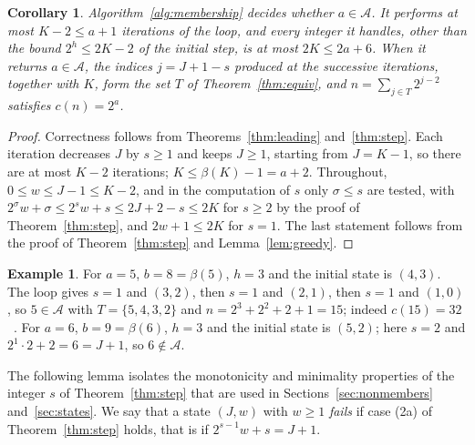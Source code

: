 \documentclass[11pt]{amsart}
\newtheorem{Corollary}[Theorem]{Corollary}
\theoremstyle{definition}
\newtheorem{Example}[Theorem]{Example}
\begin{document}
\begin{Corollary}
\label{cor:algo}
Algorithm~\ref{alg:membership} decides whether $a\in\mathcal{A}$. It performs at most $K-2\le a+1$ iterations of the loop, and every integer it handles, other than the bound $2^h\le2K-2$ of the initial step, is at most $2K\le2a+6$. When it returns $a\in\mathcal{A}$, the indices $j=J+1-s$ produced at the successive iterations, together with $K$, form the set $T$ of Theorem~\ref{thm:equiv}, and $n=\sum_{j\in T}2^{j-2}$ satisfies $c(n)=2^a$.
\end{Corollary}
\begin{proof}
Correctness follows from Theorems~\ref{thm:leading} and~\ref{thm:step}. Each iteration decreases $J$ by $s\ge1$ and keeps $J\ge1$, starting from $J=K-1$, so there are at most $K-2$ iterations; $K\le\beta(K)-1=a+2$. Throughout, $0\le w\le J-1\le K-2$, and in the computation of $s$ only $\sigma\le s$ are tested, with $2^{\sigma}w+\sigma\le2^sw+s\le2J+2-s\le2K$ for $s\ge2$ by the proof of Theorem~\ref{thm:step}, and $2w+1\le2K$ for $s=1$. The last statement follows from the proof of Theorem~\ref{thm:step} and Lemma~\ref{lem:greedy}.
\end{proof}

\begin{Example}
\label{ex:algo}
For $a=5$, $b=8=\beta(5)$, $h=3$ and the initial state is $(4,3)$. The loop gives $s=1$ and $(3,2)$, then $s=1$ and $(2,1)$, then $s=1$ and $(1,0)$, so $5\in\mathcal{A}$ with $T=\{5,4,3,2\}$ and $n=2^3+2^2+2+1=15$; indeed $c(15)=32$~\cite{nicolas2005open}. For $a=6$, $b=9=\beta(6)$, $h=3$ and the initial state is $(5,2)$; here $s=2$ and $2^{1}\cdot2+2=6=J+1$, so $6\notin\mathcal{A}$.
\end{Example}

The following lemma isolates the monotonicity and minimality properties of the integer $s$ of Theorem~\ref{thm:step} that are used in Sections~\ref{sec:nonmembers} and~\ref{sec:states}. We say that a state $(J,w)$ with $w\ge1$ \emph{fails} if case (2a) of Theorem~\ref{thm:step} holds, that is if $2^{s-1}w+s=J+1$.
\end{document}
